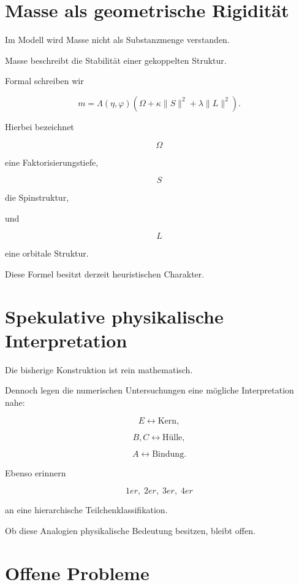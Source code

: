 \documentclass[11pt,a4paper]{article}
\theoremstyle{definition}
\theoremstyle{remark}
\begin{document}
	\section{Masse als geometrische Rigidität}
	
	Im Modell wird Masse nicht als Substanzmenge verstanden.
	
	Masse beschreibt die Stabilität
	einer gekoppelten Struktur.
	
	Formal schreiben wir
	
	\[
	m
	=
	\Lambda(\eta,\varphi)
	\left(
	\Omega
	+
	\kappa \|S\|^2
	+
	\lambda \|L\|^2
	\right).
	\]
	
	Hierbei bezeichnet
	
	\[
	\Omega
	\]
	
	eine Faktorisierungstiefe,
	
	\[
	S
	\]
	
	die Spinstruktur,
	
	und
	
	\[
	L
	\]
	
	eine orbitale Struktur.
	
	Diese Formel besitzt derzeit heuristischen Charakter.
	
	
	\section{Spekulative physikalische Interpretation}
	
	Die bisherige Konstruktion ist rein mathematisch.
	
	Dennoch legen die numerischen Untersuchungen
	eine mögliche Interpretation nahe:
	
	\[
	E
	\leftrightarrow
	\text{Kern},
	\]
	
	\[
	B,C
	\leftrightarrow
	\text{Hülle},
	\]
	
	\[
	A
	\leftrightarrow
	\text{Bindung}.
	\]
	
	Ebenso erinnern
	
	\[
	1er,\;2er,\;3er,\;4er
	\]
	
	an eine hierarchische Teilchenklassifikation.
	
	Ob diese Analogien physikalische Bedeutung besitzen,
	bleibt offen.
	
	
	\section{Offene Probleme}
	
\end{document}
